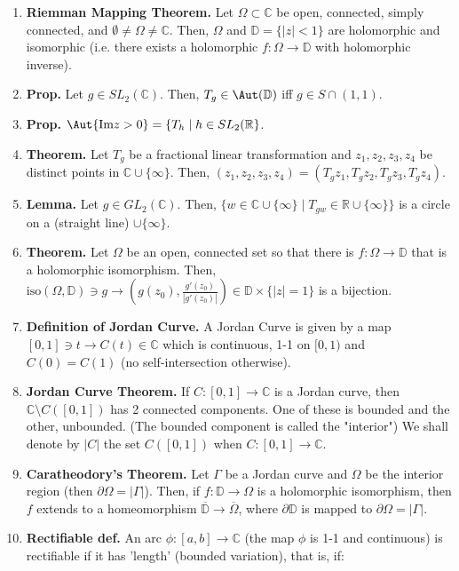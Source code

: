 \begin{enumerate}
	\item \textbf{Riemman Mapping Theorem. } Let $\Omega \subset \mathbb{C}$ be open, connected, simply connected, and $\emptyset \neq \Omega \neq \mathbb{C}$. Then, $\Omega$ and $\mathbb{D} = \{|z| < 1\}$ are holomorphic and isomorphic (i.e. there exists a holomorphic $f: \Omega \to \mathbb{D}$ with holomorphic inverse). 
	\item \textbf{Prop. } Let $g \in SL_2(\mathbb{C})$. Then, $T_g \in \Aut(\mathbb{D})$ iff $g \in S \cap (1,1)$. 
	\item \textbf{Prop. } $\Aut\{\textrm{Im}z > 0\} = \{T_h \mid h \in SL_2(\mathbb{R}\}$.
	\item \textbf{Theorem. } Let $T_g$ be a fractional linear transformation and $z_1,z_2,z_3,z_4$ be distinct points in $\mathbb{C} \cup \{\infty\}$. Then, $(z_1,z_2,z_3,z_4) = (T_gz_1, T_g z_2, T_g z_3, T_g z_4)$. 
	\item \textbf{Lemma. } Let $g \in GL_2(\mathbb{C})$. Then, $\{w \in \mathbb{C} \cup \{\infty\} \mid T_{gw} \in \mathbb{R} \cup \{\infty\}\}$ is a circle on a (straight line) $\cup \{\infty\}$.
	\item \textbf{Theorem. } Let $\Omega$ be an open, connected set so that there is $f: \Omega \to \mathbb{D}$ that is a holomorphic isomorphism. Then, $\textrm{iso}(\Omega, \mathbb{D}) \ni g \to \left(g(z_0),\frac{g'(z_0)}{|g'(z_0)|}\right) \in \mathbb{D} \times \{|z|=1\}$ is a bijection. 
	\item \textbf{Definition of Jordan Curve. } A Jordan Curve is given by a map $[0,1] \ni t \to C(t) \in \mathbb{C}$ which is continuous, 1-1 on $[0,1)$ and $C(0)=C(1)$ (no self-intersection otherwise). 
	\item \textbf{Jordan Curve Theorem. } If $C: [0,1] \to \mathbb{C}$ is a Jordan curve, then $\mathbb{C} \setminus C([0,1])$ has 2 connected components. One of these is bounded and the other, unbounded. (The bounded component is called the "interior") We shall denote by $|C|$ the set $C([0,1])$ when $C: [0,1] \to \mathbb{C}$. 
	\item \textbf{Caratheodory's Theorem. } Let $\Gamma$ be a Jordan curve and $\Omega$ be the interior region (then $\partial \Omega = |\Gamma|$). Then, if $f: \mathbb{D} \to \Omega$ is a holomorphic isomorphism, then $f$ extends to a homeomorphism $\overline{\mathbb{D}} \to \overline{\Omega}$, where $\partial \mathbb{D}$ is mapped to $\partial \Omega = |\Gamma|$.
	\item  \textbf{Rectifiable def. } An arc $\phi: [a,b] \to \mathbb{C}$ (the map $\phi$ is 1-1 and continuous) is rectifiable if it has 'length' (bounded variation), that is, if: 

\end{enumerate}
